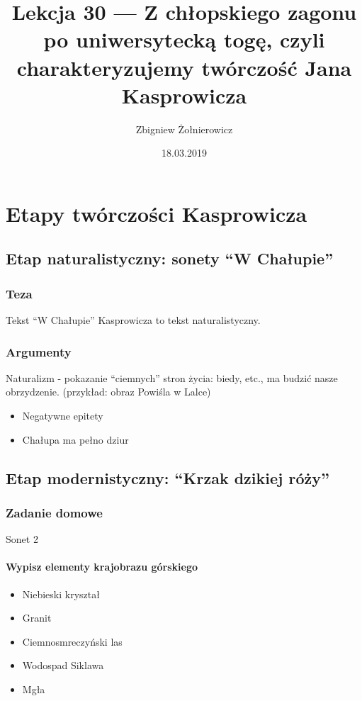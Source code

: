 \documentclass[a4paper]{article}
\begin{document}
\title{Lekcja 30 --- Z chłopskiego zagonu po uniwersytecką togę, czyli charakteryzujemy twórczość Jana Kasprowicza}
\author{Zbigniew Żołnierowicz}
\date{18.03.2019}
\maketitle
\section{Etapy twórczości Kasprowicza}
\subsection{Etap naturalistyczny: sonety ``W Chałupie''}
\subsubsection{Teza}
Tekst ``W Chałupie'' Kasprowicza to tekst naturalistyczny.
\subsubsection{Argumenty}
Naturalizm - pokazanie ``ciemnych'' stron życia: biedy, etc., ma budzić nasze obrzydzenie. (przykład: obraz Powiśla w Lalce)
\begin{itemize}
    \item Negatywne epitety
    \item Chałupa ma pełno dziur
\end{itemize}
\subsection{Etap modernistyczny: ``Krzak dzikiej róży''}
\subsubsection{Zadanie domowe}
Sonet 2
\paragraph{Wypisz elementy krajobrazu górskiego}
\begin{itemize}
    \item Niebieski kryształ
    \item Granit
    \item Ciemnosmreczyński las
    \item Wodospad Siklawa
    \item Mgła
\end{itemize}
\end{document}

